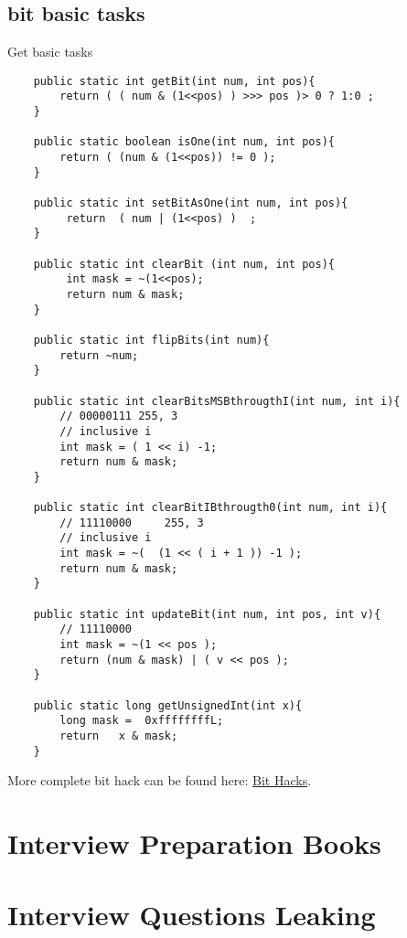 \subsection{  bit basic tasks  } 

Get basic tasks
\begin{lstlisting} 
    public static int getBit(int num, int pos){
		return ( ( num & (1<<pos) ) >>> pos )> 0 ? 1:0 ;
	}
	
	public static boolean isOne(int num, int pos){
		return ( (num & (1<<pos)) != 0 );
	}
	
	public static int setBitAsOne(int num, int pos){
		 return  ( num | (1<<pos) )  ;
	}
	
	public static int clearBit (int num, int pos){
		 int mask = ~(1<<pos);
		 return num & mask;
	}
	
	public static int flipBits(int num){
		return ~num;
	}
	
	public static int clearBitsMSBthrougthI(int num, int i){
		// 00000111 255, 3
		// inclusive i
		int mask = ( 1 << i) -1;
		return num & mask;
	}
	
	public static int clearBitIBthrougth0(int num, int i){
		// 11110000     255, 3
		// inclusive i
		int mask = ~(  (1 << ( i + 1 )) -1 );
		return num & mask;
	}
	
	public static int updateBit(int num, int pos, int v){
		// 11110000
		int mask = ~(1 << pos );
		return (num & mask) | ( v << pos );
	}

    public static long getUnsignedInt(int x){		
		long mask =  0xffffffffL;
		return   x & mask;		
	}

\end{lstlisting}

More complete bit hack can be found here: 
\href{http://graphics.stanford.edu/~seander/bithacks.html}{Bit Hacks}.

\section{Interview Preparation Books }

 

\section{Interview Questions Leaking }

